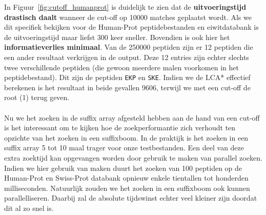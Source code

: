In Figuur~\ref{fig:cutoff_humanprot} is duidelijk te zien dat de \textbf{uitvoeringstijd drastisch daalt} wanneer de cut-off op 10000 matches geplaatst wordt.
Als we dit specifiek bekijken voor de Human-Prot peptidebestanden en eiwitdatabank is de uitvoeringstijd maar liefst 300 keer sneller.
Bovendien is ook hier het \textbf{informatieverlies minimaal}.
Van de 250000 peptiden zijn er 12 peptiden die een ander resultaat verkrijgen in de output.
Deze 12 entries zijn echter slechts twee verschillende peptiden (die gewoon meerdere malen voorkomen in het peptidebestand).
Dit zijn de peptiden \texttt{EKP} en \texttt{SKE}.
Indien we de LCA* effectief berekenen is het resultaat in beide gevallen 9606, terwijl we met een cut-off de root (1) terug geven.
\\ \\
Nu we het zoeken in de suffix array afgesteld hebben aan de hand van een cut-off is het interessant om te kijken hoe de zoekperformantie zich verhoudt ten opzichte van het zoeken in een suffixboom.
In de praktijk is het zoeken in een suffix array 5 tot 10 maal trager voor onze testbestanden.
Een deel van deze extra zoektijd kan opgevangen worden door gebruik te maken van parallel zoeken.
Indien we hier gebruik van maken duurt het zoeken van 100 peptiden op de Human-Prot en Swiss-Prot databank opnieuw enkele tientallen tot honderden milliseconden.
Natuurlijk zouden we het zoeken in een suffixboom ook kunnen parallelliseren.
Daarbij zal de absolute tijdswinst echter veel kleiner zijn doordat dit al zo snel is.

